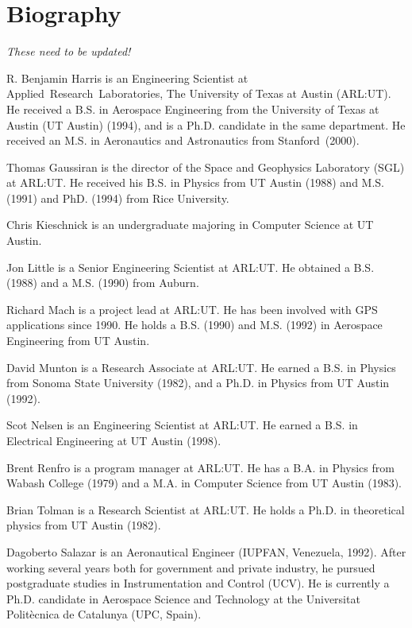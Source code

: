 
\section*{Biography}

\emph{These need to be updated!}

R. Benjamin Harris is an Engineering Scientist at \mbox{Applied Research
Laboratories}, The University of Texas at Austin (ARL:UT). He received a B.S. in Aerospace Engineering from the University of Texas at Austin (UT Austin) (1994), and is a Ph.D. candidate in the same department. He received an M.S. in Aeronautics and Astronautics from \mbox{Stanford (2000)}.

Thomas Gaussiran is the director of the Space and Geophysics Laboratory
(SGL) at ARL:UT. He received his B.S. in Physics from UT Austin (1988)
and M.S. (1991) and PhD. (1994) from Rice University.

Chris Kieschnick is an undergraduate majoring in Computer Science at UT Austin. 

Jon Little is a Senior Engineering Scientist at ARL:UT. He obtained a
B.S. (1988) and a M.S. (1990) from Auburn.

Richard Mach is a project lead at ARL:UT.  He has been involved with
GPS applications since 1990.  He holds a B.S. (1990) and M.S. (1992) in Aerospace
Engineering from UT Austin.

David Munton is a Research Associate at ARL:UT. He earned a B.S. in Physics from Sonoma State University (1982), and a Ph.D. in Physics from UT Austin (1992). 

Scot Nelsen is an Engineering Scientist at ARL:UT. He earned a B.S. in
Electrical Engineering at UT Austin (1998).

Brent Renfro is a program manager at ARL:UT.  He has a B.A. in Physics from Wabash College (1979) and a M.A. in Computer Science from UT Austin (1983).

Brian Tolman is a Research Scientist at ARL:UT. He holds a
Ph.D. in theoretical physics from UT Austin (1982).

Dagoberto Salazar is an Aeronautical Engineer (IUPFAN, Venezuela, 1992). After working several years both for government and private industry, he pursued postgraduate studies in Instrumentation and Control (UCV). He is currently a Ph.D. candidate in Aerospace Science and Technology at the Universitat Polit\`{e}cnica de Catalunya (UPC, Spain).

